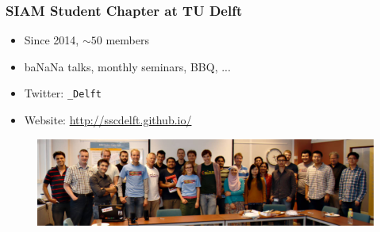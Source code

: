 \documentclass{beamer}
\begin{document}
\begin{frame}
 \frametitle{SIAM Student Chapter at TU Delft}
 \begin{itemize}
  \item Since 2014, $\sim \! 50$ members
  \item ba{\color{red}NaN}a talks, monthly seminars, BBQ, ...
  \item Twitter: \texttt{\@SSC\_Delft}
  \item Website: \href{http://sscdelft.github.io/}{http://sscdelft.github.io/}
 \end{itemize}

   \begin{figure}[h]
  \includegraphics[width=\textwidth]{pics/ssc_delft.png}
  \end{figure}
\end{frame}
\end{document}
